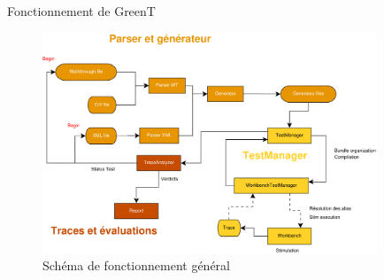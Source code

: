 \documentclass{beamer}
\begin{document}
\begin{frame}{Fonctionnement de GreenT}
	\only<1> {
	\begin{figure}[H]
		\includegraphics[width=10cm]{generalDiag.eps}
		\caption{Schéma de fonctionnement général}
	\end{figure}
	}
\end{frame}
\begin{frame}[plain]
\end{frame}
\end{document}
